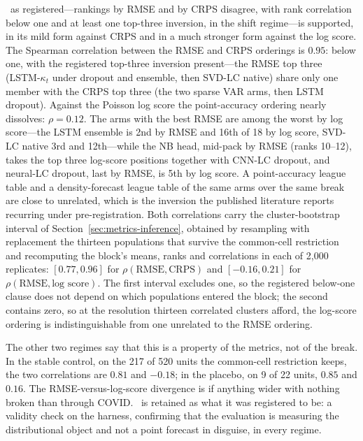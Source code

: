 \Hone\ as registered---rankings by RMSE and by CRPS disagree, with rank
correlation below one and at least one top-three inversion, in the shift
regime---is supported, in its mild form against CRPS and in a much
stronger form against the log score. The Spearman correlation between the
RMSE and CRPS orderings is $0.95$: below one, with the registered
top-three inversion present---the RMSE top three (LSTM-$\kappa_t$ under
dropout and ensemble, then SVD-LC native) share only one member with the
CRPS top three (the two sparse VAR arms, then LSTM dropout). Against the
Poisson log score the point-accuracy ordering nearly dissolves:
$\rho=0.12$. The arms with the best RMSE are among the worst by log
score---the LSTM ensemble is 2nd by RMSE and 16th of 18 by log score,
SVD-LC native 3rd and 12th---while the NB head, mid-pack by RMSE (ranks
10--12), takes the top three log-score positions together with CNN-LC
dropout, and neural-LC dropout, last by RMSE, is 5th by log score. A
point-accuracy league table and a density-forecast league table of the
same arms over the same break are close to unrelated, which is the
inversion the published literature reports
\citep{barigou2023bayesian,goes2025bayesian,schnurch2022point} recurring
under pre-registration.
Both correlations carry the cluster-bootstrap interval of
Section~\ref{sec:metrics-inference}, obtained by resampling with
replacement the thirteen populations that survive the common-cell
restriction and recomputing the block's means, ranks and correlations in
each of 2{,}000 replicates: $[0.77, 0.96]$ for $\rho(\text{RMSE},
\text{CRPS})$ and $[-0.16, 0.21]$ for $\rho(\text{RMSE}, \text{log
score})$. The first interval excludes one, so the registered
below-one clause does not depend on which populations entered the
block; the second contains zero, so at the resolution thirteen
correlated clusters afford, the log-score ordering is indistinguishable
from one unrelated to the RMSE ordering.

The other two regimes say that this is a property of the metrics, not of
the break. In the stable control, on the 217 of 520 units the common-cell
restriction keeps, the two correlations are $0.81$ and $-0.18$; in the
placebo, on 9 of 22 units, $0.85$ and $0.16$. The RMSE-versus-log-score
divergence is if anything wider with nothing broken than through COVID.
\Hone\ is retained as what it was registered to be: a validity check on
the harness, confirming that the evaluation is measuring the
distributional object and not a point forecast in disguise, in every
regime.

